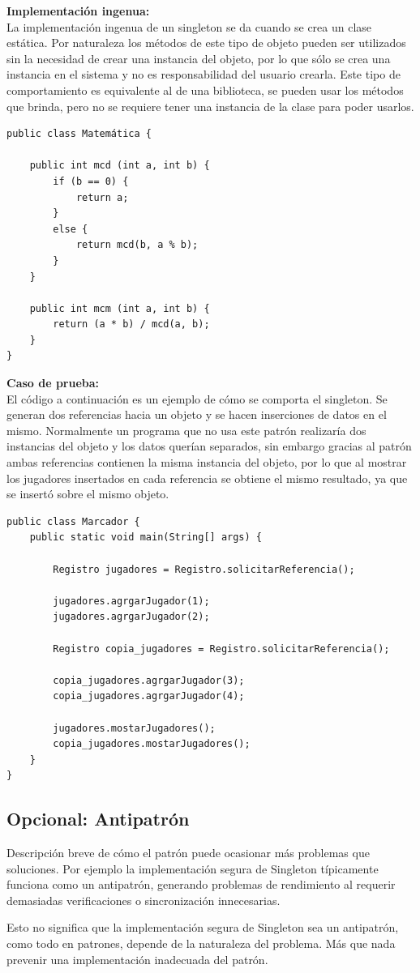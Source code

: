 \documentclass[12pt]{book}
\begin{document}
\textbf{Implementación ingenua:} \\
La implementación ingenua de un singleton se da cuando se crea un clase estática. Por naturaleza los métodos de este tipo de objeto pueden ser utilizados sin la necesidad de crear una instancia del objeto, por lo que sólo se crea una instancia en el sistema y no es responsabilidad del usuario crearla.
Este tipo de comportamiento es equivalente al de una biblioteca, se pueden usar los métodos que brinda, pero no se requiere tener una instancia de la clase para poder usarlos.

\begin{verbatim}
public class Matemática {
	
    public int mcd (int a, int b) {
        if (b == 0) {
            return a;
        }
        else {
            return mcd(b, a % b);
        }
    }
    
    public int mcm (int a, int b) {
        return (a * b) / mcd(a, b);
    }
}
\end{verbatim}

\newpage

\textbf{Caso de prueba:} \\
El código a continuación es un ejemplo de cómo se comporta el singleton. 
Se generan dos referencias hacia un objeto y se hacen inserciones de datos en el mismo. Normalmente un programa que no usa este patrón realizaría dos instancias del objeto y los datos querían separados, sin embargo gracias al patrón ambas referencias contienen la misma instancia del objeto, por lo que al mostrar los jugadores insertados en cada referencia se obtiene el mismo resultado, ya que se insertó sobre el mismo objeto.


\begin{verbatim}
public class Marcador {
    public static void main(String[] args) {
    
        Registro jugadores = Registro.solicitarReferencia();
    
        jugadores.agrgarJugador(1);
        jugadores.agrgarJugador(2);
    
        Registro copia_jugadores = Registro.solicitarReferencia();
    
        copia_jugadores.agrgarJugador(3);
        copia_jugadores.agrgarJugador(4);
        
        jugadores.mostarJugadores();
        copia_jugadores.mostarJugadores();	
    }
}
\end{verbatim}


\subsection{Opcional: Antipatrón}
Descripción breve de cómo el patrón puede ocasionar más problemas que soluciones. Por ejemplo la implementación segura de Singleton típicamente funciona como un antipatrón, generando problemas de rendimiento al requerir demasiadas verificaciones o sincronización innecesarias.

Esto no significa que la implementación segura de Singleton sea un antipatrón, como todo en patrones, depende de la naturaleza del problema. Más que nada prevenir una implementación inadecuada del patrón.
\end{document}
